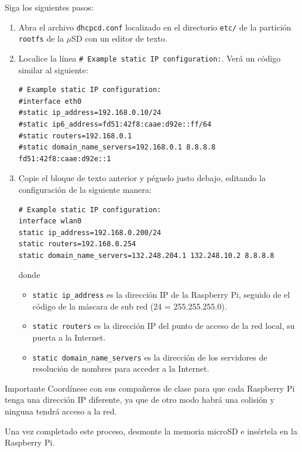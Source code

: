 \documentclass[letterpaper,10.5pt]{article}
\begin{document}
Siga los siguientes pasos:

\begin{enumerate}
	\item Abra el archivo \texttt{dhcpcd.conf} localizado en el directorio \texttt{etc/} de la partición \texttt{rootfs} de la $\mu$SD con un editor de texto.

	\item Localice la línea \texttt{\# Example static IP configuration:}. Verá un código similar al siguiente:

\begin{Verbatim}[fontsize=\footnotesize]
# Example static IP configuration:
#interface eth0
#static ip_address=192.168.0.10/24
#static ip6_address=fd51:42f8:caae:d92e::ff/64
#static routers=192.168.0.1
#static domain_name_servers=192.168.0.1 8.8.8.8 fd51:42f8:caae:d92e::1
\end{Verbatim}

	\item Copie el bloque de texto anterior y péguelo justo debajo, editando la configuración de la siguiente manera:
\begin{Verbatim}[fontsize=\footnotesize]
# Example static IP configuration:
interface wlan0
static ip_address=192.168.0.200/24
static routers=192.168.0.254
static domain_name_servers=132.248.204.1 132.248.10.2 8.8.8.8
\end{Verbatim}
	donde
	\begin{itemize}
		\item \texttt{static ip\_address} es la dirección IP de la Raspberry Pi, seguido de el código de la máscara de sub red (24 = 255.255.255.0).
		\item \texttt{static routers} es la dirección IP del punto de acceso de la red local, su puerta a la Internet.
		\item \texttt{static domain\_name\_servers} es la dirección de los servidores de resolución de nombres para acceder a la Internet.
	\end{itemize}
\end{enumerate}

\begin{greenbox}{Importante}
Coordínese con sus compañeros de clase para que cada Raspberry Pi tenga una dirección IP diferente, ya que de otro modo habrá una colisión y ninguna tendrá acceso a la red.
\end{greenbox}

Una vez completado este proceso, desmonte la memoria microSD e insértela en la Raspberry Pi.
\end{document}
